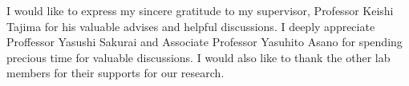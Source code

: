 \documentclass[master,english]{kuisthesis}
\date{February 7, 2014}
\begin{document}
\maketitle

\tableofcontents









\acknowledgments
I would like to express my sincere gratitude to my supervisor,
Professor Keishi Tajima for his valuable advises and helpful
discussions.  I deeply appreciate Proffessor Yasushi Sakurai and
Associate Professor Yasuhito Asano for spending precious time for
valuable discussions.  I would also like to thank the other lab members
for their supports for our research.

\nocite{*}


\end{document}

